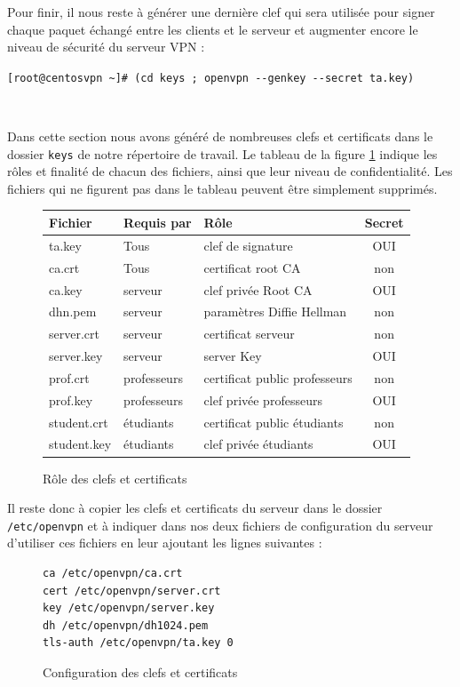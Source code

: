 Pour finir, il nous reste à générer une dernière clef qui sera utilisée pour signer chaque paquet échangé entre les clients et le serveur et augmenter encore le niveau de sécurité du serveur VPN :

\verb|[root@centosvpn ~]# (cd keys ; openvpn --genkey --secret ta.key)|

~

Dans cette section nous avons généré de nombreuses clefs et certificats dans le dossier \verb|keys| de notre répertoire de travail. Le tableau de la figure \ref{easy-rsa-clefs} indique les rôles et finalité de chacun des fichiers, ainsi que leur niveau de confidentialité. Les fichiers qui ne figurent pas dans le tableau peuvent être simplement supprimés.

\begin{figure}[H]
	\begin{center}
		\begin{tabular}{l|l|l|c}
			Fichier		& Requis par	& Rôle							& Secret\\
			\hline
			ta.key		& Tous			& clef de signature				& OUI\\
			ca.crt		& Tous			& certificat root CA			& non\\
			ca.key		& serveur		& clef privée Root CA			& OUI\\
			dh{n}.pem	& serveur		& paramètres Diffie Hellman		& non\\
			server.crt	& serveur		& certificat serveur			& non\\
			server.key	& serveur		& server Key					& OUI\\
			prof.crt	& professeurs	& certificat public professeurs	& non\\
			prof.key	& professeurs	& clef privée professeurs		& OUI\\
			student.crt	& étudiants		& certificat public étudiants	& non\\
			student.key	& étudiants		& clef privée étudiants			& OUI\\
		\end{tabular}
	\end{center}
	\caption{Rôle des clefs et certificats}
	\label{easy-rsa-clefs}
\end{figure}

Il reste donc à copier les clefs et certificats du serveur dans le dossier \verb|/etc/openvpn| et à indiquer dans nos deux fichiers de configuration du serveur d'utiliser ces fichiers en leur ajoutant les lignes suivantes :

\begin{figure}[H]
	\begin{center}
		\begin{minipage}{0.90\textwidth}
			\begin{lstlisting}[frame=trBL]
ca /etc/openvpn/ca.crt
cert /etc/openvpn/server.crt
key /etc/openvpn/server.key
dh /etc/openvpn/dh1024.pem
tls-auth /etc/openvpn/ta.key 0
			\end{lstlisting}
		\end{minipage}
	\end{center}
	\caption{Configuration des clefs et certificats}
	\label{configuration-clefs-et-certificats-serveur}
\end{figure}


